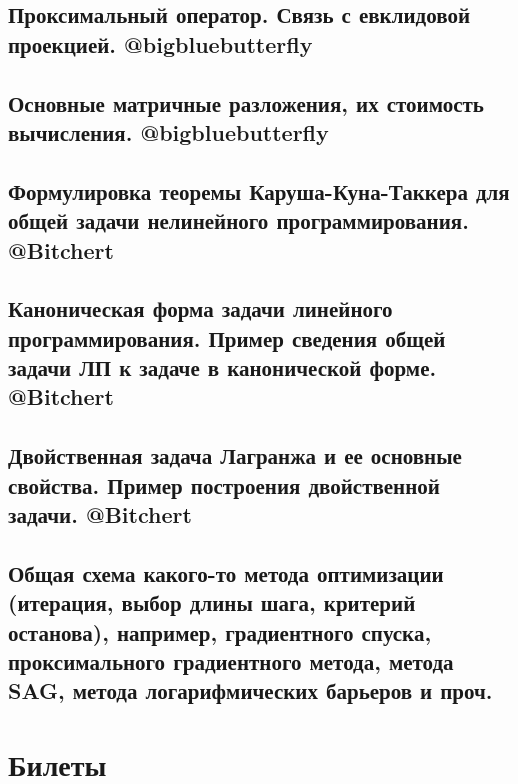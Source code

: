 \documentclass[a4paper, 16pt]{article}
\begin{document}
    

    \subsection{Проксимальный оператор. Связь с евклидовой проекцией. @bigbluebutterfly}

    

    \subsection{Основные матричные разложения, их стоимость вычисления. @bigbluebutterfly}

    

    \subsection{Формулировка теоремы Каруша-Куна-Таккера для общей задачи нелинейного программирования. @Bitchert}

    

    \subsection{Каноническая форма задачи линейного программирования. Пример сведения общей задачи ЛП к задаче в канонической форме. @Bitchert}

    

    \subsection{Двойственная задача Лагранжа и ее основные свойства. Пример построения двойственной задачи. @Bitchert}

    

    \subsection{Общая схема какого-то метода оптимизации (итерация, выбор длины шага, критерий останова), например, градиентного спуска, проксимального градиентного метода, метода SAG, метода логарифмических барьеров и проч.}

    

    \newpage

    \section{Билеты}
\end{document}

